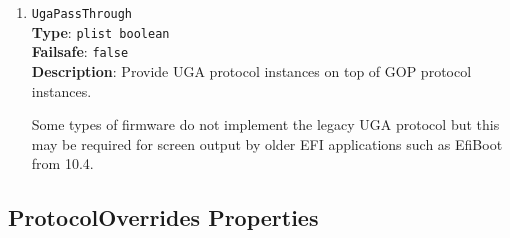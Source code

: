\documentclass[]{article}
\begin{document}
\begin{enumerate}
\item
  \texttt{UgaPassThrough}\\
  \textbf{Type}: \texttt{plist\ boolean}\\
  \textbf{Failsafe}: \texttt{false}\\
  \textbf{Description}: Provide UGA protocol instances on top of GOP protocol instances.

  Some types of firmware do not implement the legacy UGA protocol but this may be required
  for screen output by older EFI applications such as EfiBoot from 10.4.

\end{enumerate}


\subsection{ProtocolOverrides Properties}\label{uefiprotoprops}
\end{document}
